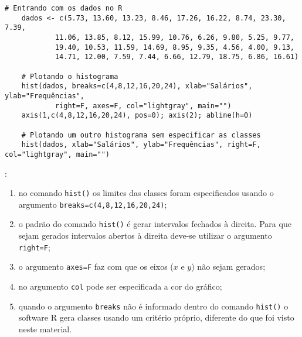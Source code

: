\documentclass[11pt,fleqn]{book} %
\begin{document}
\begin{scriptsize}
	\estiloR
	\begin{lstlisting}[caption={Comandos do software R}, label=lst:Rgraf5]
	# Entrando com os dados no R
	dados <- c(5.73, 13.60, 13.23, 8.46, 17.26, 16.22, 8.74, 23.30, 7.39,
			11.06, 13.85, 8.12, 15.99, 10.76, 6.26, 9.80, 5.25, 9.77,
			19.40, 10.53, 11.59, 14.69, 8.95, 9.35, 4.56, 4.00, 9.13,
			14.71, 12.00, 7.59, 7.44, 6.66, 12.79, 18.75, 6.86, 16.61)
	 	
	# Plotando o histograma 
	hist(dados, breaks=c(4,8,12,16,20,24), xlab="Salários", ylab="Frequências",
			right=F, axes=F, col="lightgray", main="") 
	axis(1,c(4,8,12,16,20,24), pos=0); axis(2); abline(h=0)
	
	# Plotando um outro histograma sem especificar as classes
	hist(dados, xlab="Salários", ylab="Frequências", right=F, col="lightgray", main="") 

	\end{lstlisting}
\end{scriptsize}


: 

\begin{enumerate}[label=\alph*)]

\item no comando \texttt{hist()} os limites das classes foram especificados usando o argumento \texttt{breaks=c(4,8,12,16,20,24)};

\item o padrão do comando \texttt{hist()} é gerar intervalos fechados à direita. Para que sejam gerados intervalos abertos à direita deve-se utilizar o argumento \texttt{right=F};

\item o argumento \texttt{axes=F} faz com que os eixos ($x$ e $y$) não sejam gerados;

\item no argumento \texttt{col} pode ser especificada a cor do gráfico;

\item quando o argumento \texttt{breaks} não é informado dentro do comando \texttt{hist()} o software R gera classes usando um critério próprio, diferente do que foi visto neste material.

\end{enumerate}



\end{document}
